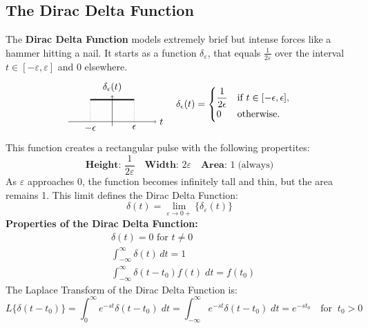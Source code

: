 \documentclass[a4paper, 10pt]{article}
\begin{document}
\subsection{The Dirac Delta Function}
The \textbf{Dirac Delta Function} models extremely brief but intense forces
like a hammer hitting a nail. 
It starts as a function $\delta_{\varepsilon}$, that equals $\frac{1}{2\varepsilon}$ over the interval
$t \in  [-\varepsilon, \varepsilon]$ and $0$ elsewhere. 
$$
  \begin{array}{r@{\quad}l}
    \begin{tikzpicture}[scale=0.8, baseline={(current bounding box.center)}]
      \pgfmathsetmacro{\eps}{1} %
      \pgfmathsetmacro{\hgt}{1/(\eps)}
      \draw[->] (-2,0) -- (2,0) node[right] {$t$};
      \draw[->] (0,-0.2) -- (0,1.2) node[above] {$\delta_{\epsilon}(t)$};
      \draw[line width=1.2pt] (-\eps,\hgt) -- (\eps,\hgt);
      \draw[dotted] (-\eps,0) -- (-\eps,\hgt);
      \draw[dotted] (\eps,0) -- (\eps,\hgt);
      \node[below] at (-\eps,0) {$-\epsilon$};
      \node[below] at (\eps,0) {$\epsilon$};
    \end{tikzpicture}
     &
    \delta_{\epsilon}(t)=
    \begin{cases}
      \dfrac{1}{2\epsilon} & \text{if } t \in  [-\epsilon,\epsilon], \\
      0                    & \text{otherwise.}
    \end{cases}
  \end{array}
$$
This function creates a rectangular pulse with the following propertites:
$$\textbf{Height: } \frac{1}{2 \varepsilon} \quad \textbf{Width: } 2\varepsilon \quad \textbf{Area: } 1\;\text{(always)}$$
As $\varepsilon$ approaches 0, the function becomes infinitely tall and thin, but the area remains 1. This limit defines the Dirac Delta Function:
$$\delta(t) = \lim_{\varepsilon \to 0+} \{\delta_{\varepsilon}(t)\}$$
\textbf{Properties of the Dirac Delta Function:}
\begin{align*}
  &\delta(t) = 0 \text{ for } t \neq 0 \\
  &\int_{-\infty}^{\infty} \delta(t)\, dt = 1 \\
  &\int_{-\infty}^{\infty} \delta(t-t_0)f(t)\; dt = f(t_0) 
\end{align*}
The Laplace Transform of the Dirac Delta Function is:
$$L\{\delta(t-t_0)\} = \int_{0}^{\infty} e^{-st}\delta(t - t_0) \; dt = \int_{-\infty}^{\infty} e^{-st}\delta(t-t_0) \; dt = e^{-st_0} \quad \text{for} \; \; t_0 > 0$$
\end{document}
